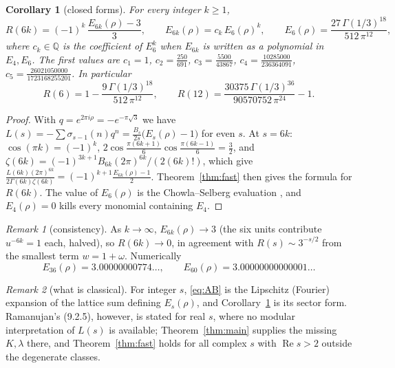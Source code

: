 \documentclass[11pt]{article}
\newtheorem{corollary}{Corollary}
\theoremstyle{remark}
\newtheorem{remark}{Remark}
\begin{document}
\begin{corollary}[closed forms]\label{cor:6k}
For every integer $k\ge1$,
\[
R(6k)=(-1)^k\,\frac{E_{6k}(\rho)-3}{3},\qquad E_{6k}(\rho)=c_k\,E_6(\rho)^k,\qquad E_6(\rho)=\frac{27\,\Gamma(1/3)^{18}}{512\,\pi^{12}},
\]
where $c_k\in\mathbb Q$ is the coefficient of $E_6^k$ when $E_{6k}$ is written as a polynomial in $E_4,E_6$. The first values are
$c_1=1$, $c_2=\frac{250}{691}$, $c_3=\frac{5500}{43867}$, $c_4=\frac{10285000}{236364091}$, $c_5=\frac{26021050000}{1723168255201}$. In particular
\[
R(6)=1-\frac{9\,\Gamma(1/3)^{18}}{512\,\pi^{12}},\qquad R(12)=\frac{30375\,\Gamma(1/3)^{36}}{90570752\,\pi^{24}}-1.
\]
\end{corollary}
\begin{proof}
With $q=e^{2\pi i\rho}=-e^{-\pi\sqrt3}$ we have $L(s)=-\sum\sigma_{s-1}(n)q^n=\frac{B_s}{2s}\bigl(E_s(\rho)-1\bigr)$ for even $s$.
At $s=6k$: $\cos(\pi k)=(-1)^k$, $2\cos\frac{\pi(6k+1)}6\cos\frac{\pi(6k-1)}6=\frac32$, and
$\zeta(6k)=(-1)^{3k+1}B_{6k}(2\pi)^{6k}/(2(6k)!)$, which give $\frac{L(6k)(2\pi)^{6k}}{2\Gamma(6k)\zeta(6k)}=(-1)^{k+1}\frac{E_{6k}(\rho)-1}{2}$.
Theorem~\ref{thm:fast} then gives the formula for $R(6k)$. The value of $E_6(\rho)$ is the Chowla--Selberg evaluation \cite{CS}, and
$E_4(\rho)=0$ kills every monomial containing $E_4$.
\end{proof}

\begin{remark}[consistency]
As $k\to\infty$, $E_{6k}(\rho)\to3$ (the six units contribute $u^{-6k}=1$ each, halved), so $R(6k)\to0$, in agreement with
$R(s)\sim3^{-s/2}$ from the smallest term $w=1+\omega$. Numerically
\[E_{36}(\rho)=3.00000000774\ldots,\qquad E_{60}(\rho)=3.00000000000001\ldots\]
\end{remark}

\begin{remark}[what is classical]\label{rem:classical}
For integer $s$, \eqref{eq:AB} is the Lipschitz (Fourier) expansion of the lattice sum defining $E_s(\rho)$, and
Corollary~\ref{cor:6k} is its sector form. Ramanujan's (9.2.5), however, is stated for real $s$, where no modular interpretation of
$L(s)$ is available; Theorem~\ref{thm:main} supplies the missing $K,\lambda$ there, and Theorem~\ref{thm:fast} holds for all complex $s$
with $\operatorname{Re}s>2$ outside the degenerate classes.
\end{remark}
\end{document}
